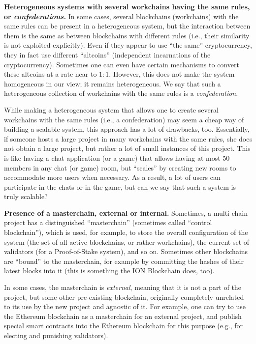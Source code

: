 \documentclass[12pt,oneside]{article}
\def\makepoint#1{\medbreak\noindent{\bf #1.\ }}
\def\nxsubpoint{\refstepcounter{subsubsection}%
  \smallbreak\makepoint{\thesubsubsection}}
\def\embt(#1.){\textbf{#1.}}
\begin{document}
\nxsubpoint\label{sp:het.confed} \embt(Heterogeneous systems with
several workchains having the same rules, or {\em confederations}.)
In some cases, several blockchains (work\-chains) with the same rules
can be present in a heterogeneous system, but the interaction between
them is the same as between blockchains with different rules (i.e.,
their similarity is not exploited explicitly). Even if they appear to
use ``the same'' cryptocurrency, they in fact use different
``altcoins'' (independent incarnations of the
cryptocurrency). Sometimes one can even have certain mechanisms to
convert these altcoins at a rate near to $1:1$. However, this does not
make the system homogeneous in our view; it remains heterogeneous. We
say that such a heterogeneous collection of workchains with the same
rules is a {\em confederation}.

While making a heterogeneous system that allows one to create several
work\-chains with the same rules (i.e., a confederation) may seem a
cheap way of building a scalable system, this approach has a lot of
drawbacks, too. Essentially, if someone hosts a large project in many
workchains with the same rules, she does not obtain a large project,
but rather a lot of small instances of this project. This is like
having a chat application (or a game) that allows having at most 50
members in any chat (or game) room, but ``scales'' by creating new
rooms to accommodate more users when necessary. As a result, a lot of
users can participate in the chats or in the game, but can we say that
such a system is truly scalable?

\nxsubpoint\label{sp:pres.masterch} \embt(Presence of a masterchain,
external or internal.)  Sometimes, a multi-chain project has a
distinguished ``masterchain'' (sometimes called ``control
blockchain''), which is used, for example, to store the overall
configuration of the system (the set of all active blockchains, or
rather workchains), the current set of validators (for a
Proof-of-Stake system), and so on. Sometimes other blockchains are
``bound'' to the masterchain, for example by committing the hashes of
their latest blocks into it (this is something the ION Blockchain
does, too).

In some cases, the masterchain is {\em external}, meaning that it is
not a part of the project, but some other pre-existing blockchain,
originally completely unrelated to its use by the new project and
agnostic of it. For example, one can try to use the Ethereum
blockchain as a masterchain for an external project, and publish
special smart contracts into the Ethereum blockchain for this purpose
(e.g., for electing and punishing validators).
\end{document}
